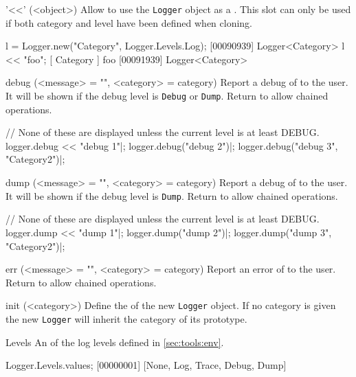 \begin{urbiscriptapi}

\item['<<'](<object>)%
  Allow to use the \lstinline|Logger| object as a . This
  slot can only be used if both category and level have been defined when
  cloning.

\begin{urbiscript}
l = Logger.new("Category", Logger.Levels.Log);
[00090939] Logger<Category>
l << "foo";
[       Category        ] foo
[00091939] Logger<Category>
\end{urbiscript}

\item[debug](<message> = "", <category> = category)%
  Report a debug  of  to the user. It will be
  shown if the debug level is \lstinline|Debug| or \lstinline|Dump|. Return
  \this to allow chained operations.
\begin{urbiscript}
// None of these are displayed unless the current level is at least DEBUG.
logger.debug << "debug 1"|;
logger.debug("debug 2")|;
logger.debug("debug 3", "Category2")|;
\end{urbiscript}

\item[dump](<message> = "", <category> = category)%
  Report a debug  of  to the user. It will be
  shown if the debug level is \lstinline|Dump|. Return \this to allow
  chained operations.
\begin{urbiscript}
// None of these are displayed unless the current level is at least DEBUG.
logger.dump << "dump 1"|;
logger.dump("dump 2")|;
logger.dump("dump 3", "Category2")|;
\end{urbiscript}

\item[err](<message> = "", <category> = category)%
  Report an error  of  to the user. Return \this
  to allow chained operations.

\item[init](<category>)%
  Define the  of the new \lstinline|Logger| object. If no
  category is given the new \lstinline|Logger| will inherit the category of
  its prototype.

\item[Levels]%
  An  of the log levels defined in
  \autoref{sec:tools:env}.

\begin{urbiscript}
Logger.Levels.values;
[00000001] [None, Log, Trace, Debug, Dump]
\end{urbiscript}


\end{urbiscriptapi}
